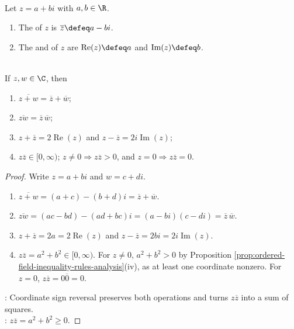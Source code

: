 \begin{definition} \label{def:complex-conjugate-real-imaginary-parts} \\
Let $z=a+bi$ with $a,b\in\R$.
\begin{enumerate}[label=(\roman*)]
\setlength{\itemsep}{0pt}
\item The  of $z$ is $\overline{z}\defeq a-bi$.
\item The  and  of $z$ are $\operatorname{Re}(z)\defeq a$ and $\operatorname{Im}(z)\defeq b$.
\end{enumerate}
\end{definition}

\begin{proposition} \label{prop:complex-conjugation-identities} \\
If $z,w\in\C$, then
\begin{enumerate}[label=(\roman*)]
\setlength{\itemsep}{0pt}
\item $\overline{z+w}=\overline{z}+\overline{w}$;
\item $\overline{zw}=\overline{z}\,\overline{w}$;
\item $z+\overline{z}=2\operatorname{Re}(z)$ and $z-\overline{z}=2i\operatorname{Im}(z)$;
\item $z\overline{z}\in[0,\infty)$; $z\neq0\Rightarrow z\overline{z}>0$, and $z=0\Rightarrow z\overline{z}=0$.
\end{enumerate}
\begin{proof}
Write $z=a+bi$ and $w=c+di$.
\begin{enumerate}[label=(\roman*)]
\setlength{\itemsep}{0pt}
\item $\overline{z+w}=(a+c)-(b+d)i=\overline{z}+\overline{w}$.
\item $\overline{zw}=(ac-bd)-(ad+bc)i=(a-bi)(c-di)=\overline{z}\,\overline{w}$.
\item $z+\overline{z}=2a=2\operatorname{Re}(z)$ and $z-\overline{z}=2bi=2i\operatorname{Im}(z)$.
\item $z\overline{z}=a^2+b^2\in[0,\infty)$. For $z\neq0$, $a^2+b^2>0$ by Proposition \ref{prop:ordered-field-inequality-rules-analysis}(iv), as at least one coordinate nonzero. For $z=0$, $z\overline{z}=0\overline{0}=0$.
\end{enumerate}
: Coordinate sign reversal preserves both operations and turns $z\overline{z}$ into a sum of squares.\\
: $z\overline{z}=a^2+b^2\geq0$.
\end{proof}
\end{proposition}

